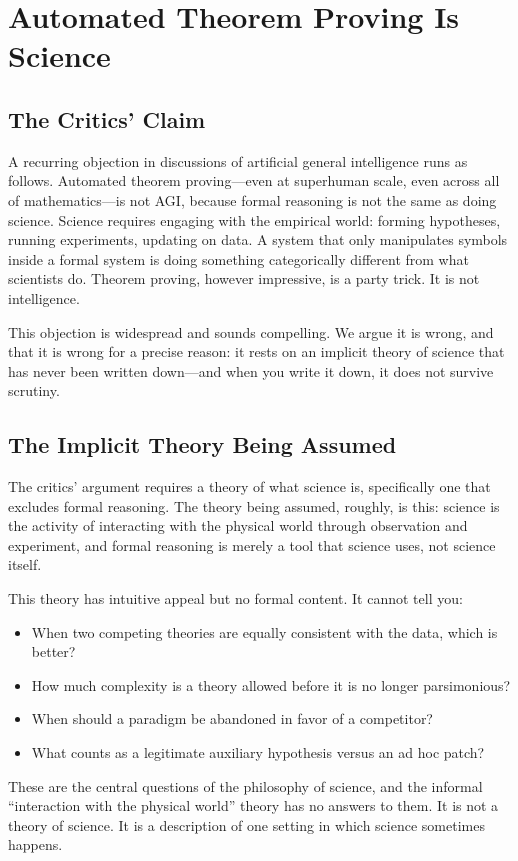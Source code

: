\section{Automated Theorem Proving Is Science}
\label{sec:agi}

\subsection{The Critics' Claim}

A recurring objection in discussions of artificial general intelligence
runs as follows. Automated theorem proving---even at superhuman scale,
even across all of mathematics---is not AGI, because formal reasoning
is not the same as doing science. Science requires engaging with the
empirical world: forming hypotheses, running experiments, updating on
data. A system that only manipulates symbols inside a formal system is
doing something categorically different from what scientists do.
Theorem proving, however impressive, is a party trick. It is not
intelligence.

This objection is widespread and sounds compelling. We argue it is
wrong, and that it is wrong for a precise reason: it rests on an
implicit theory of science that has never been written down---and when
you write it down, it does not survive scrutiny.

\subsection{The Implicit Theory Being Assumed}

The critics' argument requires a theory of what science is,
specifically one that excludes formal reasoning. The theory being
assumed, roughly, is this: science is the activity of interacting with
the physical world through observation and experiment, and formal
reasoning is merely a tool that science uses, not science itself.

This theory has intuitive appeal but no formal content. It cannot
tell you:
\begin{itemize}
  \item When two competing theories are equally consistent with the
        data, which is better?
  \item How much complexity is a theory allowed before it is no longer
        parsimonious?
  \item When should a paradigm be abandoned in favor of a competitor?
  \item What counts as a legitimate auxiliary hypothesis versus an ad
        hoc patch?
\end{itemize}
These are the central questions of the philosophy of science, and the
informal ``interaction with the physical world'' theory has no answers
to them. It is not a theory of science. It is a description of one
setting in which science sometimes happens.

